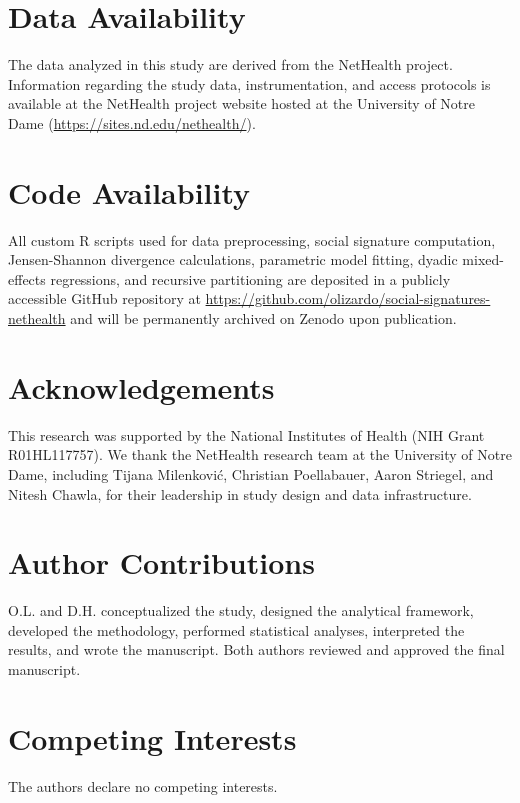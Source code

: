 \documentclass[11pt,letterpaper]{article}
\begin{document}
\section*{Data Availability}
The data analyzed in this study are derived from the NetHealth project. Information regarding the study data, instrumentation, and access protocols is available at the NetHealth project website hosted at the University of Notre Dame (\url{https://sites.nd.edu/nethealth/}).

\section*{Code Availability}
All custom \textsf{R} scripts used for data preprocessing, social signature computation, Jensen-Shannon divergence calculations, parametric model fitting, dyadic mixed-effects regressions, and recursive partitioning are deposited in a publicly accessible GitHub repository at \url{https://github.com/olizardo/social-signatures-nethealth} and will be permanently archived on Zenodo upon publication.

\section*{Acknowledgements}
This research was supported by the National Institutes of Health (NIH Grant R01HL117757). We thank the NetHealth research team at the University of Notre Dame, including Tijana Milenkovi{\'c}, Christian Poellabauer, Aaron Striegel, and Nitesh Chawla, for their leadership in study design and data infrastructure.

\section*{Author Contributions}
O.L. and D.H. conceptualized the study, designed the analytical framework, developed the methodology, performed statistical analyses, interpreted the results, and wrote the manuscript. Both authors reviewed and approved the final manuscript.

\section*{Competing Interests}
The authors declare no competing interests.




\newpage

\end{document}

